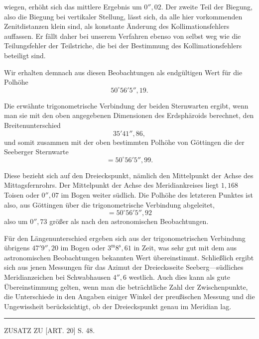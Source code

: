 \noindent wiegen, erhöht sich das mittlere Ergebnis um \(0''{,}02\). Der zweite
Teil der Biegung, also die Biegung bei vertikaler Stellung, lässt sich, da alle
hier vorkommenden Zenitdistanzen klein sind, als konstante Änderung des
Kollimationsfehlers auffassen. Er fällt daher bei unserem Verfahren ebenso
von selbst weg wie die Teilungsfehler der Teilstriche, die bei der Bestimmung
des Kollimationsfehlers beteiligt sind.

Wir erhalten demnach aus diesen Beobachtungen als endgültigen Wert für die Polhöhe
\[
50^\circ56'5''{,}19.
\]

Die erwähnte trigonometrische Verbindung der beiden Sternwarten ergibt, wenn
man sie mit den oben angegebenen Dimensionen des Erdsphäroids berechnet, den
Breitenunterschied
\[
35'41''{,}86,
\]
\noindent und somit zusammen mit der oben bestimmten Polhöhe von Göttingen die
der Seeberger Sternwarte
\[
=50^\circ56'5''{,}99.
\]

Diese bezieht sich auf den Dreieckspunkt, nämlich den Mittelpunkt der Achse
des Mittagsfernrohrs. Der Mittelpunkt der Achse des Meridiankreises liegt
\(1{,}168\) Toisen oder \(0''{,}07\) im Bogen weiter südlich. Die Polhöhe des
letzteren Punktes ist also, aus Göttingen über die trigonometrische Verbindung abgeleitet,
\[
=50^\circ56'5''{,}92
\]
\noindent also um \(0''{,}73\) größer als nach den astronomischen Beobachtungen.

Für den Längenunterschied ergeben sich aus der trigonometrischen Verbindung
übrigens \(47'9''{,}20\) im Bogen oder \(3^{\mathrm m}8^{\mathrm s}{,}61\) in Zeit,
was sehr gut mit dem aus astronomischen Beobachtungen bekannten Wert übereinstimmt.
Schließlich ergibt sich aus jenen Messungen für das Azimut der Dreiecksseite
Seeberg---südliches Meridianzeichen bei Schwabhausen \(4''{,}6\) westlich.
Auch dies kann als gute Übereinstimmung gelten, wenn man die beträchtliche
Zahl der Zwischenpunkte, die Unterschiede in den Angaben einiger Winkel der
preußischen Messung und die Ungewissheit berücksichtigt, ob der Dreieckspunkt
genau im Meridian lag.

\begin{center}\rule{.24\textwidth}{.4pt}\end{center}

\par\clearpage

\vspace*{.055\textheight}
\begin{center}{\Large ZUSATZ ZU [ART. 20] S. 48.}\end{center}

